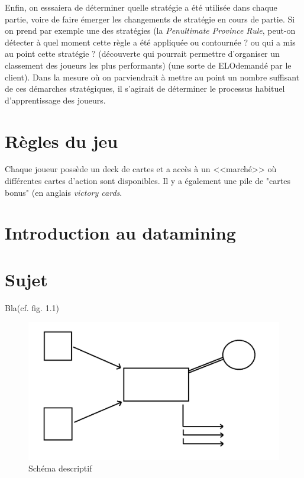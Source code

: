 Enfin, on esssaiera de déterminer quelle stratégie a été utilisée dans chaque partie, voire de faire émerger les changements de stratégie en cours de partie. Si on prend par exemple une des stratégies (la \textit{Penultimate Province Rule}, peut-on détecter à quel moment cette règle a été appliquée ou contournée ? ou qui a mis au point cette stratégie ? (découverte qui pourrait permettre d'organiser un classement des joueurs les plus performants) (une sorte de ELO\footnotemark demandé par le client). Dans la mesure où on parviendrait à mettre au point un nombre suffisant de ces démarches stratégiques, il s'agirait de déterminer le processus habituel d'apprentissage des joueurs.


\section{Règles du jeu}
Chaque joueur possède un deck de cartes et a accès à un <<marché>> où différentes cartes d'action sont disponibles. Il y a également une pile de "cartes bonus" (en anglais \textit{victory cards}.\\

\section{Introduction au datamining}


\section{Sujet}

Bla(cf. fig. 1.1)\\

\begin{figure}[!h]
\begin{center}
\includegraphics[width=15cm]{presentation/schema}
\end{center}
\caption{Schéma descriptif}
\end{figure}


